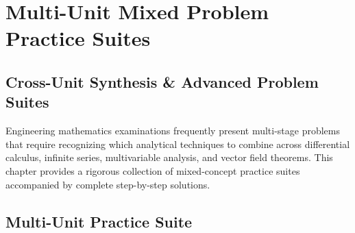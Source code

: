 \chapter{Multi-Unit Mixed Problem Practice Suites}
\label{chap:mixed-problem-practice}

\section{Cross-Unit Synthesis \& Advanced Problem Suites}

Engineering mathematics examinations frequently present multi-stage problems that require recognizing which analytical techniques to combine across differential calculus, infinite series, multivariable analysis, and vector field theorems. This chapter provides a rigorous collection of mixed-concept practice suites accompanied by complete step-by-step solutions.

\section{Multi-Unit Practice Suite}

